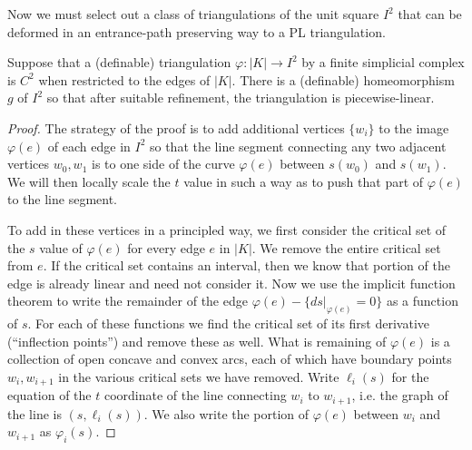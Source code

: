 Now we must select out a class of triangulations of the unit square $I^2$ that can be deformed in an entrance-path preserving way to a PL triangulation.

\begin{prop}\label{prop:PL}
	Suppose that a (definable) triangulation $\varphi:|K|\to I^2$ by a finite simplicial complex is $C^2$ when restricted to the edges of $|K|$. There is a (definable) homeomorphism $g$ of $I^2$ so that after suitable refinement, the triangulation is piecewise-linear.
\end{prop}
\begin{proof}
	The strategy of the proof is to add additional vertices $\{w_i\}$ to the image $\varphi(e)$ of each edge in $I^2$ so that the line segment connecting any two adjacent vertices $w_0,w_1$ is to one side of the curve $\varphi(e)$ between $s(w_0)$ and $s(w_1)$. We will then locally scale the $t$ value in such a way as to push that part of $\varphi(e)$ to the line segment.
	
	To add in these vertices in a principled way, we first consider the critical set of the $s$ value of $\varphi(e)$ for every edge $e$ in $|K|$. We remove the entire critical set from $e$. If the critical set contains an interval, then we know that portion of the edge is already linear and need not consider it. Now we use the implicit function theorem to write the remainder of the edge $\varphi(e)-\{ds|_{\varphi(e)}=0\}$ as a function of $s$. For each of these functions we find the critical set of its first derivative (``inflection points'') and remove these as well. What is remaining of $\varphi(e)$ is a collection of open concave and convex arcs, each of which have boundary points $w_i,w_{i+1}$ in the various critical sets we have removed. Write $\ell_i(s)$ for the equation of the $t$ coordinate of the line connecting $w_i$ to $w_{i+1}$, i.e. the graph of the line is $(s,\ell_i(s))$. We also write the portion of $\varphi(e)$ between $w_i$ and $w_{i+1}$ as $\varphi_i(s)$.
	

\end{proof}

